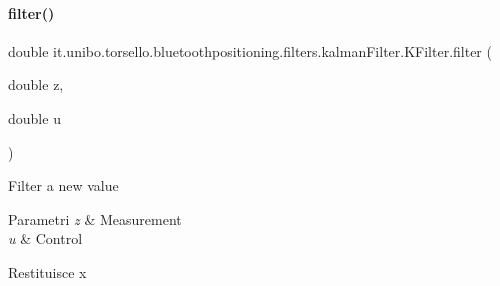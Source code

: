 \paragraph{\texorpdfstring{filter()}{filter()}\hspace{0.1cm}{\footnotesize\ttfamily [2/2]}}
{\footnotesize\ttfamily double it.\+unibo.\+torsello.\+bluetoothpositioning.\+filters.\+kalman\+Filter.\+K\+Filter.\+filter (\begin{DoxyParamCaption}\item[{double}]{z,  }\item[{double}]{u }\end{DoxyParamCaption})\hspace{0.3cm}{\ttfamily [private]}}

Filter a new value


\begin{DoxyParams}{Parametri}
{\em z} & Measurement \\
\hline
{\em u} & Control \\
\hline
\end{DoxyParams}
\begin{DoxyReturn}{Restituisce}
x 
\end{DoxyReturn}

